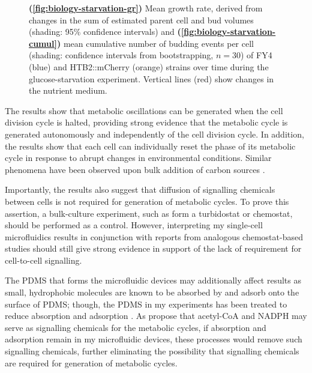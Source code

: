 \begin{figure}
  \caption[
    Mean growth rate, derived from changes in the sum of estimated parent cell and bud volumes and
    mean cumulative number of budding events per cell
    of FY4 and HTB2::mCherry strains over time during the glucose-starvation experiment.
  ]{
    \textbf{(\ref{fig:biology-starvation-gr})}
    Mean growth rate, derived from changes in the sum of estimated parent cell and bud volumes (shading: 95\% confidence intervals) and
    \textbf{(\ref{fig:biology-starvation-cumul})}
    mean cumulative number of budding events per cell (shading: confidence intervals from bootstrapping, $n=30$)
    of FY4 (blue) and HTB2::mCherry (orange) strains over time during the glucose-starvation experiment.
    Vertical lines (red) show changes in the nutrient medium.
  }
  \label{fig:biology-starvation-gr-budprob}
\end{figure}

The results show that metabolic oscillations can be generated when the cell division cycle is halted, providing strong evidence that the metabolic cycle is generated autonomously and independently of the cell division cycle.
In addition, the results show that each cell can individually reset the phase of its metabolic cycle in response to abrupt changes in environmental conditions.
Similar phenomena have been observed upon bulk addition of carbon sources \parencite{kuangMsn2RegulateExpression2017, krishnaMinimalPushPull2018}.

Importantly, the results also suggest that diffusion of signalling chemicals between cells is not required for generation of metabolic cycles.
To prove this assertion, a bulk-culture experiment, such as form a turbidostat or chemostat, should be performed as a control.
However, interpreting my single-cell microfluidics results in conjunction with reports from analogous chemostat-based studies \parencite{tuLogicYeastMetabolic2005} should still give strong evidence in support of the lack of requirement for cell-to-cell signalling.

The PDMS that forms the microfluidic devices may additionally affect results as small, hydrophobic molecules are known to be absorbed by \parencite{toepkePDMSAbsorptionSmall2006} and adsorb onto the surface of \parencite{liPDMSCompoundAdsorption2009} PDMS\@; though, the PDMS in my experiments has been treated to reduce absorption and adsorption \parencite{craneMicrofluidicSystemStudying2014}.
As \textcite{krishnaMinimalPushPull2018} propose that acetyl-CoA and NADPH may serve as signalling chemicals for the metabolic cycles, if absorption and adsorption remain in my microfluidic devices, these processes would remove such signalling chemicals, further eliminating the possibility that signalling chemicals are required for generation of metabolic cycles.

